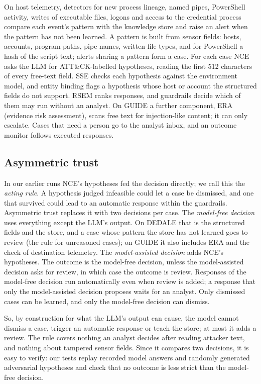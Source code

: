 \documentclass[conference]{IEEEtran}
\begin{document}
On host telemetry, detectors for new process lineage, named pipes, PowerShell activity, writes of executable
files, logons and access to the credential process compare each event's pattern with the knowledge store and raise
an alert when the pattern has not been learned. A pattern is built from sensor fields: hosts, accounts, program
paths, pipe names, written-file types, and for PowerShell a hash of the script text; alerts sharing a pattern form a case. For each case NCE asks the LLM
for ATT\&CK-labelled hypotheses, reading the first 512 characters of every free-text field. SSE checks each
hypothesis against the environment model, and entity binding flags a hypothesis whose host or account the
structured fields do not support. RSEM ranks responses, and guardrails decide which of them may run without an
analyst. On GUIDE a further component, ERA (evidence risk assessment), scans free text for injection-like content;
it can only escalate. Cases that need a person go to the analyst inbox, and an outcome monitor follows executed
responses.

\subsection{Asymmetric trust}
In our earlier runs NCE's hypotheses fed the decision directly; we call this the \emph{acting rule}. A hypothesis
judged infeasible could let a case be dismissed, and one that survived could lead to an automatic response within
the guardrails. Asymmetric trust replaces it with two decisions per case. The \emph{model-free decision} uses
everything except the LLM's output. On DEDALE that is the structured fields and the store, and a case whose pattern
the store has not learned goes to review (the rule for unreasoned cases); on GUIDE it also includes ERA and the
check of destination telemetry.
The \emph{model-assisted decision} adds NCE's hypotheses. The outcome is the model-free decision, unless the
model-assisted decision asks for review, in which case the outcome is review. Responses of the model-free decision
run automatically even when review is added; a response that only the model-assisted decision proposes waits for
an analyst. Only dismissed cases can be learned, and only the model-free decision can dismiss.

So, by construction for what the LLM's output can cause, the model cannot dismiss a case, trigger an automatic
response or teach the store; at most it adds a review. The rule covers nothing an analyst decides after reading
attacker text, and nothing about tampered sensor fields. Since it compares two decisions, it is easy to verify: our
tests replay recorded model answers and randomly generated adversarial hypotheses and check that no outcome is
less strict than the model-free decision.
\end{document}
